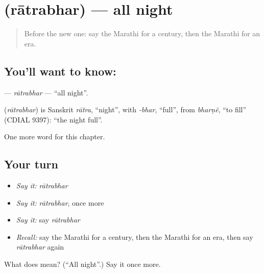 \section[\texorpdfstring{\mr{रात्रभर} (rātrabhar)}{रात्रभर (rātrabhar)}]{ (rātrabhar) — all night}

\label{lesson:MR-C258-ratrabhar}



\begin{quote}
Before the new one: say the Marathi for a century, then the Marathi for an era.
\end{quote}

\subsection*{You'll want to know: }
\textbf{} — \emph{rātrabhar} — \textquotedblleft{}all night\textquotedblright{}.

\begin{cousinweb}
\textbf{} (\emph{rātrabhar}) is Sanskrit \emph{rātra}, \textquotedblleft{}night\textquotedblright{}, with \emph{-bhar}, \textquotedblleft{}full\textquotedblright{}, from \emph{bharṇẽ}, \textquotedblleft{}to fill\textquotedblright{} (CDIAL 9397): \textquotedblleft{}the night full\textquotedblright{}.
\end{cousinweb}

\begin{grammarlens}[title={What you've built}]
One more word for this chapter.
\end{grammarlens}

\subsection*{Your turn}
\begin{itemize}
\raggedright
  \item \emph{Say it:} \emph{rātrabhar}
  \item \emph{Say it:} \emph{rātrabhar}, once more
  \item \emph{Say it:} say \emph{rātrabhar}
  \item \emph{Recall:} say the Marathi for a century, then the Marathi for an era, then say \emph{rātrabhar} again
\end{itemize}

\begin{tcolorbox}[breakable,colback=teal!4,colframe=teal!35!black,title={Before you move on}]
What does  mean? (\textquotedblleft{}All night\textquotedblright{}.) Say it once more.
\end{tcolorbox}

